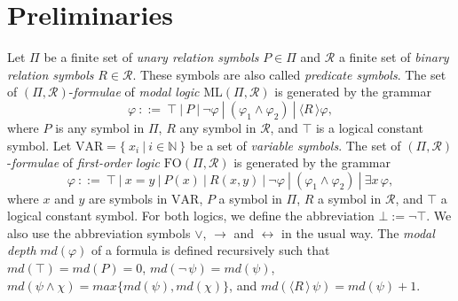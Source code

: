 \documentclass[copyright,creativecommons]{eptcs}
\begin{document}
\section{Preliminaries}\label{preliminaries}








Let $\Pi$ be a finite  set of
\emph{unary relation symbols} $P\in\Pi$ and $\mathcal{R}$ a finite set of
\emph{binary relation symbols} $R\in\mathcal{R}$. These symbols are also called
\emph{predicate symbols}. 
The set of $(\Pi,\mathcal{R})$-\emph{formulae} of \emph{modal logic} $\mathrm{ML}(\Pi,\mathcal{R})$
is generated by the grammar
$$\varphi\ ::=\ \top\ |\ P\ |\ \neg\varphi\ |\ (\varphi_1\wedge\varphi_2)\ |\ \langle R\, \rangle \varphi,$$
where $P$ is any symbol in $\Pi$,  $R$ any symbol in $\mathcal{R}$, and $\top$ is a logical constant  symbol.
Let $\mathrm{VAR} = \{\ x_i\ |\ i\in\mathbb{N}\ \}$ 
be a set of \emph{variable symbols}. 
The set of $(\Pi,\mathcal{R})$-\emph{formulae} of \emph{first-order logic} $\mathrm{FO}(\Pi,\mathcal{R})$ 
is generated by the grammar
$$\varphi\ ::=\ \top\ |\ x = y\ |\ 
P(x)\ |\ R(x,y)\ |\ \neg\varphi\ |\ (\varphi_1\wedge\varphi_2)\ |\ \exists x\, \varphi,$$
where $x$ and $y$ are symbols in $\mathrm{VAR}$,
$P$ a symbol in $\Pi$,  $R$ a symbol in $\mathcal{R}$, and $\top$ a logical constant  symbol.
For both logics, we define the abbreviation $\bot := \neg\top$. We also
use the abbreviation symbols $\vee$, $\rightarrow$ and $\leftrightarrow$ in the usual way.
The \emph{modal depth} $\mathit{md}(\varphi)$ of a formula is defined recursively such that
$\mathit{md}(\top) = \mathit{md}(P) = 0$, $\mathit{md}(\neg\, \psi) = \mathit{md}(\psi)$,
$\mathit{md}(\psi\wedge\chi) = \mathit{max}\{\mathit{md}(\psi),\mathit{md}(\chi)\}$, and
$\mathit{md}(\langle R\, \rangle\, \psi) = \mathit{md}(\psi) + 1$.
\end{document}
